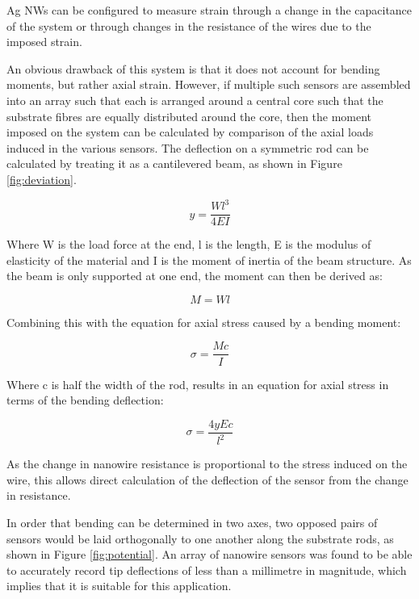 \documentclass[conference, a4paper]{IEEEtran}
\begin{document}
Ag NWs can be configured to measure strain through a change in the capacitance of the system\cite{Ho2015} or through
changes in the resistance of the wires due to the imposed strain.



An obvious drawback of this system is that it does not account for bending moments, but rather axial strain.
However, if multiple such sensors are assembled into an array such that each is arranged around a central core
such that the substrate fibres are equally distributed around the core, then the moment imposed on the system
can be calculated by comparison of the axial loads induced in the various sensors. The deflection on a 
symmetric rod can be calculated by treating it as a cantilevered beam, as shown in Figure \ref{fig:deviation}.

\begin{equation}
	y = \frac{Wl^{3}}{4EI}
	\label{eqn:y}
\end{equation}

Where W is the load force at the end, l is the length, E is the
modulus of elasticity of the material and I is the moment of
inertia of the beam structure. As the beam is only supported
at one end, the moment can then be derived as:

\begin{equation}
	M = Wl
	\label{eqn:M}
\end{equation}


Combining this with the equation for axial stress caused by
a bending moment:

\begin{equation}
	\sigma = \frac{Mc}{I}
	\label{eqn:sigma1}
\end{equation}

Where c is half the width of the rod, results in an equation for 
axial stress in terms of the bending deflection:

\begin{equation}
	\sigma = \frac{4yEc}{l^{2}}
	\label{eqn:sigma2}
\end{equation}

As the change in nanowire resistance is proportional to the
stress induced on the wire, this allows direct calculation of the
deflection of the sensor from the change in resistance.




In order that bending can be
determined in two axes, two opposed pairs of sensors would be laid orthogonally to one another along the
substrate rods, as shown in Figure \ref{fig:potential}. An array of nanowire sensors was
found to be able to accurately record tip deflections of less than a millimetre in magnitude, which implies that it
is suitable for this application.\cite{Ho2015}
\end{document}
